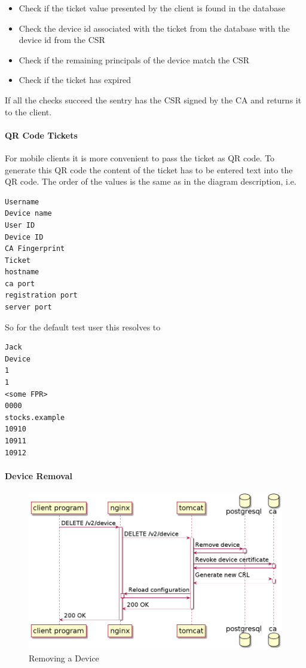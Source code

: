 \documentclass{memoir}
\begin{document}
\begin{itemize}
    \item Check if the ticket value presented by the client is found in the database
    \item Check the device id associated with the ticket from the database with the
            device id from the CSR
    \item Check if the remaining principals of the device match the CSR
    \item Check if the ticket has expired
\end{itemize}

If all the checks succeed the sentry has the CSR signed by the CA and returns it
to the client.

\paragraph{QR Code Tickets}

For mobile clients it is more convenient to pass the ticket as QR code. To
generate this QR code the content of the ticket has to be entered text into the
QR code. The order of the values is the same as in the diagram description, i.e.

\begin{lstlisting}
Username
Device name
User ID
Device ID
CA Fingerprint
Ticket
hostname
ca port
registration port
server port
\end{lstlisting}

So for the default test user this resolves to

\begin{lstlisting}
Jack
Device
1
1
<some FPR>
0000
stocks.example
10910
10911
10912
\end{lstlisting}

\paragraph{Device Removal\\}

\begin{figure}[!ht]
\includegraphics[width=\linewidth]{diagrams/remove-device.png}
\caption{Removing a Device}
\end{figure}
\end{document}
